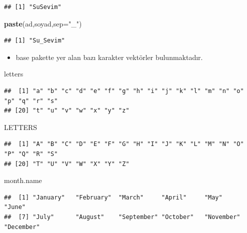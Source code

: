 \documentclass[
  oneside]{book}
\newenvironment{Shaded}{\begin{snugshade}}{\end{snugshade}}
\newcommand{\AttributeTok}[1]{\textcolor[rgb]{0.13,0.29,0.53}{#1}}
\newcommand{\FunctionTok}[1]{\textcolor[rgb]{0.13,0.29,0.53}{\textbf{#1}}}
\newcommand{\NormalTok}[1]{#1}
\newcommand{\StringTok}[1]{\textcolor[rgb]{0.31,0.60,0.02}{#1}}
\providecommand{\tightlist}{%
  \setlength{\itemsep}{0pt}\setlength{\parskip}{0pt}}
\begin{document}
\begin{verbatim}
## [1] "SuSevim"
\end{verbatim}

\begin{Shaded}
\begin{Highlighting}[]
\FunctionTok{paste}\NormalTok{(ad,soyad,}\AttributeTok{sep=}\StringTok{"\_"}\NormalTok{)}
\end{Highlighting}
\end{Shaded}

\begin{verbatim}
## [1] "Su_Sevim"
\end{verbatim}

\begin{itemize}
\tightlist
\item
  base pakette yer alan bazı karakter vektörler bulunmaktadır.
\end{itemize}

\begin{Shaded}
\begin{Highlighting}[]
\NormalTok{letters}
\end{Highlighting}
\end{Shaded}

\begin{verbatim}
##  [1] "a" "b" "c" "d" "e" "f" "g" "h" "i" "j" "k" "l" "m" "n" "o" "p" "q" "r" "s"
## [20] "t" "u" "v" "w" "x" "y" "z"
\end{verbatim}

\begin{Shaded}
\begin{Highlighting}[]
\NormalTok{LETTERS}
\end{Highlighting}
\end{Shaded}

\begin{verbatim}
##  [1] "A" "B" "C" "D" "E" "F" "G" "H" "I" "J" "K" "L" "M" "N" "O" "P" "Q" "R" "S"
## [20] "T" "U" "V" "W" "X" "Y" "Z"
\end{verbatim}

\begin{Shaded}
\begin{Highlighting}[]
\NormalTok{month.name}
\end{Highlighting}
\end{Shaded}

\begin{verbatim}
##  [1] "January"   "February"  "March"     "April"     "May"       "June"     
##  [7] "July"      "August"    "September" "October"   "November"  "December"
\end{verbatim}
\end{document}
